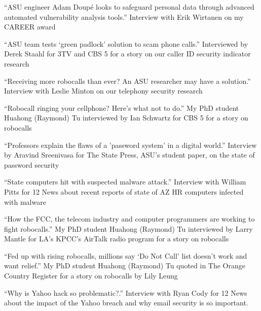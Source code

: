 \documentclass[11pt,letterpaper,sans]{moderncv}
\begin{document}


 {``ASU engineer Adam Doup\'e looks to
  safeguard personal data through advanced automated vulnerability
  analysis tools.'' Interview with Erik Wirtanen on my CAREER award}

 {``ASU team tests `green padlock' solution to
  scam phone calls.'' Interviewed by Derek Staahl for 3TV and CBS 5
  for a story on our caller ID security indicator research}

 {``Receiving more robocalls than ever? An ASU
  researcher may have a solution.'' Interview with Leslie Minton on our
  telephony security research}

 {``Robocall ringing your cellphone? Here's
  what not to do.'' My PhD student Huahong (Raymond) Tu interviewed by
  Ian Schwartz for CBS 5 for a story on robocalls}

 {``Professors explain the flaws of a
  'password system' in a digital world.'' Interview by Aravind
  Sreenivasa for The State Press, ASU's student paper, on the state of
  password security}

 {``State computers hit with suspected
  malware attack.'' Interview with William Pitts for 12 News about
  recent reports of state of AZ HR computers infected with malware}

 {``How the FCC, the telecom industry and
  computer programmers are working to fight robocalls.'' My PhD
  student Huahong (Raymond) Tu interviewed by Larry Mantle for LA’s KPCC’s AirTalk radio program for a story on robocalls}

 {``Fed up with rising robocalls, millions
  say ‘Do Not Call’ list doesn’t work and want relief.'' My PhD
  student Huahong (Raymond) Tu quoted in The Orange Country Register for a story on robocalls by Lily Leung}

 {``Why is Yahoo hack so problematic?.'' Interview with Ryan Cody for 12 News about the impact of the Yahoo breach and why email security is so important.}
\end{document}
